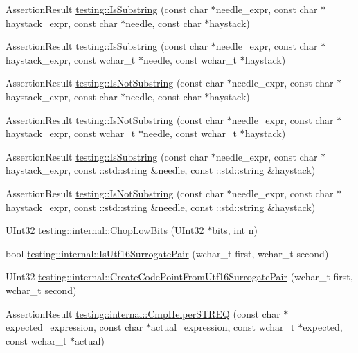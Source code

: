 \begin{DoxyCompactItemize}
\item 
Assertion\-Result \hyperlink{namespacetesting_a390c4f66fe7e9098117eb77e5fffa4ad}{testing\-::\-Is\-Substring} (const char $\ast$needle\-\_\-expr, const char $\ast$haystack\-\_\-expr, const char $\ast$needle, const char $\ast$haystack)
\item 
Assertion\-Result \hyperlink{namespacetesting_aa1c82529c7591d2a9fd016de45dd9113}{testing\-::\-Is\-Substring} (const char $\ast$needle\-\_\-expr, const char $\ast$haystack\-\_\-expr, const wchar\-\_\-t $\ast$needle, const wchar\-\_\-t $\ast$haystack)
\item 
Assertion\-Result \hyperlink{namespacetesting_a2288dcf4249f88af67dcd46544dc49a6}{testing\-::\-Is\-Not\-Substring} (const char $\ast$needle\-\_\-expr, const char $\ast$haystack\-\_\-expr, const char $\ast$needle, const char $\ast$haystack)
\item 
Assertion\-Result \hyperlink{namespacetesting_a53e5c6e91ea429c43de7f4f57e33d166}{testing\-::\-Is\-Not\-Substring} (const char $\ast$needle\-\_\-expr, const char $\ast$haystack\-\_\-expr, const wchar\-\_\-t $\ast$needle, const wchar\-\_\-t $\ast$haystack)
\item 
Assertion\-Result \hyperlink{namespacetesting_a571c7edcfc574269833ebe3e7d338ec5}{testing\-::\-Is\-Substring} (const char $\ast$needle\-\_\-expr, const char $\ast$haystack\-\_\-expr, const \-::std\-::string \&needle, const \-::std\-::string \&haystack)
\item 
Assertion\-Result \hyperlink{namespacetesting_abe7b3fa1c9528745f934d4a14155ea87}{testing\-::\-Is\-Not\-Substring} (const char $\ast$needle\-\_\-expr, const char $\ast$haystack\-\_\-expr, const \-::std\-::string \&needle, const \-::std\-::string \&haystack)
\item 
U\-Int32 \hyperlink{namespacetesting_1_1internal_a2c54b453387aa8a18f2f3e09f10b5a7d}{testing\-::internal\-::\-Chop\-Low\-Bits} (U\-Int32 $\ast$bits, int n)
\item 
bool \hyperlink{namespacetesting_1_1internal_a681895f8cc32286211be9889da107394}{testing\-::internal\-::\-Is\-Utf16\-Surrogate\-Pair} (wchar\-\_\-t first, wchar\-\_\-t second)
\item 
U\-Int32 \hyperlink{namespacetesting_1_1internal_ac8ef1bb10cd9e69de939789b759e6bc9}{testing\-::internal\-::\-Create\-Code\-Point\-From\-Utf16\-Surrogate\-Pair} (wchar\-\_\-t first, wchar\-\_\-t second)
\item 
Assertion\-Result \hyperlink{namespacetesting_1_1internal_a5a60e3eb4490e67f00fdb62dd147cd89}{testing\-::internal\-::\-Cmp\-Helper\-S\-T\-R\-E\-Q} (const char $\ast$expected\-\_\-expression, const char $\ast$actual\-\_\-expression, const wchar\-\_\-t $\ast$expected, const wchar\-\_\-t $\ast$actual)

\end{DoxyCompactItemize}

